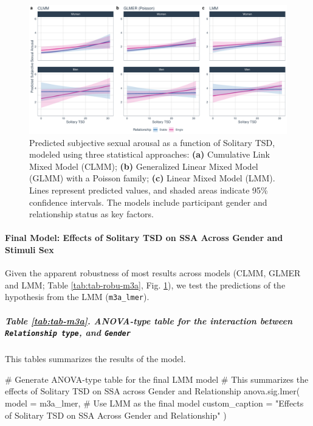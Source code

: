 \documentclass[
  bookmarksnumbered]{article}
\newenvironment{Shaded}{\begin{snugshade}}{\end{snugshade}}
\newcommand{\AttributeTok}[1]{\textcolor[rgb]{0.80,0.80,0.80}{#1}}
\newcommand{\CommentTok}[1]{\textcolor[rgb]{0.50,0.62,0.50}{#1}}
\newcommand{\FunctionTok}[1]{\textcolor[rgb]{0.94,0.94,0.56}{#1}}
\newcommand{\NormalTok}[1]{\textcolor[rgb]{0.80,0.80,0.80}{#1}}
\newcommand{\StringTok}[1]{\textcolor[rgb]{0.80,0.58,0.58}{#1}}
\begin{document}
\begin{figure}
\centering
\includegraphics{Sexual_Desire_Arousal_anonymous_files/figure-latex/preds-m3a-1.pdf}
\caption{\label{fig:preds-m3a}Predicted subjective sexual arousal as a function of Solitary TSD, modeled using three statistical approaches: \textbf{(a)} Cumulative Link Mixed Model (CLMM); \textbf{(b)} Generalized Linear Mixed Model (GLMM) with a Poisson family; \textbf{(c)} Linear Mixed Model (LMM). Lines represent predicted values, and shaded areas indicate 95\% confidence intervals. The models include participant gender and relationship status as key factors.}
\end{figure}

\paragraph{Final Model: Effects of Solitary TSD on SSA Across Gender and Stimuli Sex}\label{final-model-effects-of-solitary-tsd-on-ssa-across-gender-and-stimuli-sex-1}

Given the apparent robustness of most results across models (CLMM, GLMER and LMM; Table \ref{tab:tab-robu-m3a}, Fig. \ref{fig:preds-m3a}), we test the predictions of the hypothesis from the LMM (\texttt{m3a\_lmer}).

\subparagraph{\texorpdfstring{Table \ref{tab:tab-m3a}. ANOVA-type table for the interaction between \texttt{Relationship\ type}, and \texttt{Gender}}{Table \ref{tab:tab-m3a}. ANOVA-type table for the interaction between Relationship type, and Gender}}\label{table-reftabtab-m3a.-anova-type-table-for-the-interaction-between-relationship-type-and-gender}

This tables summarizes the results of the model.

\begin{Shaded}
\begin{Highlighting}[]
\CommentTok{\# Generate ANOVA{-}type table for the final LMM model}
\CommentTok{\# This summarizes the effects of Solitary TSD on SSA across Gender and Relationship}
\FunctionTok{anova.sig.lmer}\NormalTok{(}
  \AttributeTok{model =}\NormalTok{ m3a\_lmer, }\CommentTok{\# Use LMM as the final model}
  \AttributeTok{custom\_caption =} \StringTok{"Effects of Solitary TSD on SSA Across Gender and Relationship"}
\NormalTok{)}
\end{Highlighting}
\end{Shaded}
\end{document}

